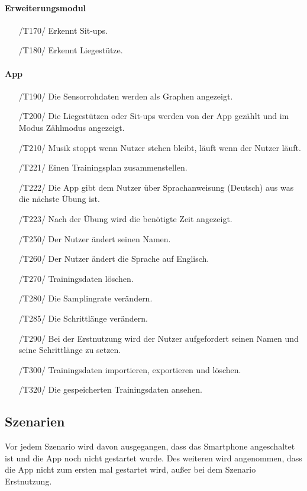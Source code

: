 \documentclass[a4paper,12pt]{article}
\begin{document}
  \paragraph{Erweiterungsmodul}
    \begin{itemize}
    \item[/T170/] Erkennt Sit-ups. 
    \item[/T180/] Erkennt Liegestütze.
  \end{itemize}
  \paragraph{App}
  \begin{itemize}
    \item[/T190/] Die Sensorrohdaten werden als Graphen angezeigt.
    \item[/T200/] Die Liegestützen oder Sit-ups werden von der App gezählt und im Modus \glqq{}Zählmodus \grqq{} angezeigt.
    \item[/T210/] Musik stoppt wenn Nutzer stehen bleibt, läuft wenn der Nutzer läuft.
    \item[/T221/] Einen Trainingsplan zusammenstellen.
    \item[/T222/] Die App gibt dem Nutzer über Sprachanweisung (Deutsch) aus was die nächste Übung ist.
    \item[/T223/] Nach der Übung wird die benötigte Zeit angezeigt.
    \item[/T250/] Der Nutzer ändert seinen Namen.
    \item[/T260/] Der Nutzer ändert die Sprache auf Englisch.
    \item[/T270/] Trainingsdaten löschen.
    \item[/T280/] Die Samplingrate verändern.
    \item[/T285/] Die Schrittlänge verändern.
    \item[/T290/] Bei der Erstnutzung wird der Nutzer aufgefordert seinen Namen und seine Schrittlänge zu setzen.
    \item[/T300/] Trainingsdaten importieren, exportieren und löschen.
    \item[/T320/] Die gespeicherten Trainingsdaten ansehen.
   \end{itemize}
   
  \subsection{Szenarien}
	Vor jedem Szenario wird davon ausgegangen, dass das Smartphone angeschaltet ist und die App noch nicht gestartet wurde. Des weiteren wird angenommen, dass die App nicht zum ersten mal gestartet wird, außer bei dem Szenario \glqq{}Erstnutzung\grqq{}.
\end{document}
